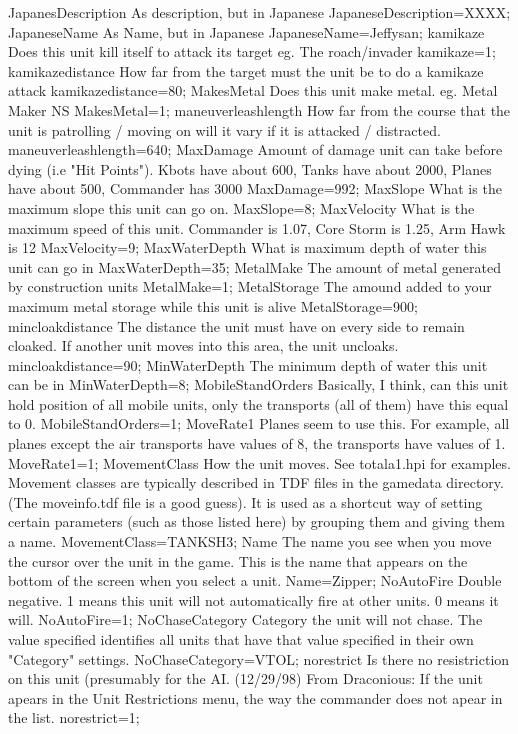 \documentclass[a4paper,10pt]{article}
\begin{document}
JapanesDescription 	As description, but in Japanese 	JapaneseDescription=XXXX;
JapaneseName 	As Name, but in Japanese 	JapaneseName=Jeffysan;
kamikaze 	Does this unit kill itself to attack its target eg. The roach/invader 	kamikaze=1;
kamikazedistance 	How far from the target must the unit be to do a kamikaze attack 	kamikazedistance=80;
MakesMetal 	Does this unit make metal. eg. Metal Maker NS 	MakesMetal=1;
maneuverleashlength 	How far from the course that the unit is patrolling / moving on will it vary if it is attacked / distracted. 	maneuverleashlength=640;
MaxDamage 	Amount of damage unit can take before dying (i.e "Hit Points").  Kbots have about 600, Tanks have about 2000, Planes have about 500, Commander has 3000 	MaxDamage=992;
MaxSlope 	What is the maximum slope this unit can go on. 	MaxSlope=8;
MaxVelocity 	What is the maximum speed of this unit.   Commander is 1.07, Core Storm is 1.25, Arm Hawk is 12 	MaxVelocity=9;
MaxWaterDepth 	What is maximum depth of water this unit can go in 	MaxWaterDepth=35;
MetalMake 	The amount of metal generated by construction units 	MetalMake=1;
MetalStorage 	The amound added to your maximum metal storage while this unit is alive 	MetalStorage=900;
mincloakdistance 	The distance the unit must have on every side to remain cloaked. If another unit moves into this area, the unit uncloaks. 	mincloakdistance=90;
MinWaterDepth 	The minimum depth of water this unit can be in 	MinWaterDepth=8;
MobileStandOrders 	Basically, I think, can this unit hold position of all mobile units, only the transports (all of them) have this equal to 0. 	MobileStandOrders=1;
MoveRate1 	Planes seem to use this. For example, all planes except the air transports have values of 8, the transports have values of 1. 	MoveRate1=1;
MovementClass 	How the unit moves. See totala1.hpi for examples.   Movement classes are typically described in TDF files in the gamedata directory.  (The moveinfo.tdf file is a good guess).  It is used as a shortcut way of setting certain parameters (such as those listed here) by grouping them and giving them a name. 	MovementClass=TANKSH3;
Name 	The name you see when you move the cursor over the unit in the game.  This is the name that appears on the bottom of the screen when you select a unit.   	Name=Zipper;
NoAutoFire 	Double negative. 1 means this unit will not automatically fire at other units. 0 means it will. 	NoAutoFire=1;
NoChaseCategory 	Category the unit will not chase.  The value specified identifies all units that have that value specified in their own "Category" settings. 	NoChaseCategory=VTOL;
norestrict 	Is there no resistriction on this unit (presumably for the AI.  (12/29/98) From Draconious:  If the unit apears in the Unit Restrictions menu, the way the commander does not apear in the list. 	norestrict=1;
\end{document}
